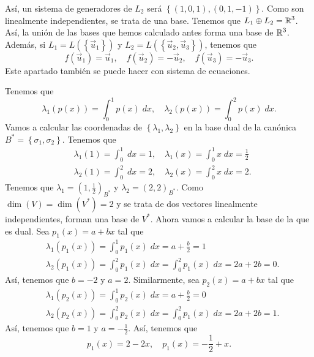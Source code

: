 \documentclass{article}
\begin{document}
\begin{sol}
Así, un sistema de generadores de $\displaystyle L_{2} $ será $\displaystyle \left\{ \left(1,0,1\right), \left(0, 1, -1\right)\right\}  $. Como son linealmente independientes, se trata de una base. Tenemos que $\displaystyle L_{1} \oplus L_{2} = \mathbb{R}^{3} $. Así, la unión de las bases que hemos calculado antes forma una base de $\displaystyle \mathbb{R}^{3} $. Además, si $\displaystyle L_{1} = L\left( \left\{ \vec{u}_{1}\right\} \right) $ y $\displaystyle L_{2} = L\left( \left\{ \vec{u}_{2}, \vec{u}_{3}\right\} \right) $, tenemos que 
\[f\left(\vec{u}_{1}\right) = \vec{u}_{1}, \quad f\left(\vec{u}_{2}\right) = -\vec{u}_{2}, \quad f\left(\vec{u}_{3}\right) = -\vec{u}_{3} .\]
Este apartado también se puede hacer con sistema de ecuaciones.
\end{sol}

\begin{sol}
Tenemos que 
\[\lambda_{1}\left(p\left(x\right)\right) = \int^{1}_{0} p\left(x\right) \; dx, \quad \lambda_{2}\left(p\left(x\right)\right) = \int^{2}_{0} p\left(x\right) \; dx .\]
Vamos a calcular las coordenadas de $\displaystyle \left\{ \lambda_{1}, \lambda_{2}\right\}  $ en la base dual de la canónica $\displaystyle B^{*} = \left\{ \sigma_{1}, \sigma_{2}\right\}  $. Tenemos que
\[
\begin{split}
& \lambda_{1}\left(1\right) = \int^{1}_{0}  \; dx = 1, \quad \lambda_{1}\left(x\right) = \int^{1}_{0} x \; dx = \frac{1}{2} \\
& \lambda_{2}\left(1\right) = \int^{2}_{0}  \; dx = 2, \quad \lambda_{2}\left(x\right) = \int^{2}_{0} x \; dx = 2.
\end{split}
\]
Tenemos que $\displaystyle \lambda_{1} = \left(1, \frac{1}{2}\right)_{B^{*}} $ y $\displaystyle \lambda_{2} = \left(2,2\right)_{B^{*}} $. Como $\displaystyle \dim\left(V\right) = \dim\left(V^{*}\right) = 2 $ y se trata de dos vectores linealmente independientes, forman una base de $\displaystyle V^{*} $. Ahora vamos a calcular la base de la que es dual. Sea $\displaystyle p_{1}\left(x\right)= a + bx $ tal que 
\[
\begin{split}
	& \lambda_{1}\left(p_{1}\left(x\right)\right) = \int^{1}_{0} p_{1}\left(x\right) \; dx = a + \frac{b}{2} = 1 \\
	& \lambda_{2}\left(p_{1}\left(x\right)\right) = \int^{2}_{0} p_{1}\left(x\right) \; dx = \int^{2}_{0} p_{1}\left(x\right)\; dx = 2a + 2b = 0.
\end{split}
\]
Así, tenemos que $\displaystyle b = -2 $ y $\displaystyle a = 2 $. Similarmente, sea $\displaystyle p_{2}\left(x\right) = a + bx $ tal que 
\[
\begin{split}
	& \lambda_{1}\left(p_{2}\left(x\right)\right) = \int^{1}_{0} p_{2}\left(x\right) \; dx = a + \frac{b}{2} = 0 \\
	& \lambda_{2}\left(p_{2}\left(x\right)\right) = \int^{2}_{0} p_{2}\left(x\right) \; dx = \int^{2}_{0} p_{1}\left(x\right)\; dx = 2a + 2b = 1.
\end{split}
\]
Así, tenemos que $\displaystyle b = 1 $ y $\displaystyle a = -\frac{1}{2} $. Así, tenemos que 
\[p_{1}\left(x\right) = 2 - 2x, \quad p_{1}\left(x\right) = -\frac{1}{2} + x .\]
\end{sol}
\end{document}
